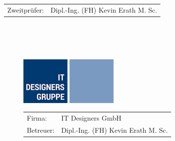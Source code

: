 \begin{titlepage}
\begin{tabular}{rl}
		Zweitprüfer: & Dipl.-Ing. (FH) Kevin Erath M. Sc.\\
	\end{tabular}
	~\\ ~\\ ~\\	
	\begin{figure}[H]
		\begin{minipage}{0.4\textwidth}
			\begin{center}
				\includegraphics[width=.8\textwidth]{images/itd_logo}
			\end{center}
		\end{minipage}%
		\begin{minipage}{0.7\textwidth}
			\begin{tabular}{ll}
				Firma: & IT Designers GmbH\\
				Betreuer: & Dipl.-Ing. (FH) Kevin Erath M. Sc.
			\end{tabular}
		\end{minipage}
	\end{figure}
\end{titlepage}





